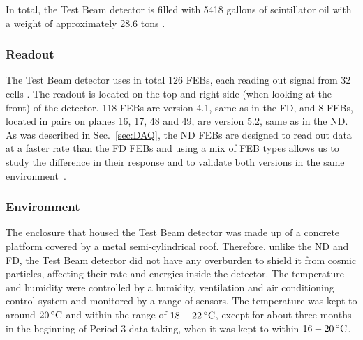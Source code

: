 
In total, the Test Beam detector is filled with 5418 gallons of scintillator oil with a weight of approximately 28.6 tons \cite{NOvA-doc-29543}.

\subsubsection*{Readout}
The Test Beam detector uses in total 126 \glspl{FEB}, each reading out signal from 32 cells \cite{NOvA-doc-29543}. The readout is located on the top and right side (when looking at the front) of the detector. 118 \glspl{FEB} are version 4.1, same as in the \gls{FD}, and 8 \glspl{FEB}, located in pairs on planes 16, 17, 48 and 49, are version 5.2, same as in the \gls{ND}. As was described in Sec.~\ref{sec:DAQ}, the \gls{ND} \glspl{FEB} are designed to read out data at a faster rate than the \gls{FD} \glspl{FEB} and using a mix of \gls{FEB} types allows us to study the difference in their response and to validate both versions in the same environment~\cite{LackeyThesisNOvATBProtons2022.pdf}.


\subsubsection*{Environment}
The enclosure that housed the Test Beam detector was made up of a concrete platform covered by a metal semi-cylindrical roof. Therefore, unlike the \gls{ND} and \gls{FD}, the Test Beam detector did not have any overburden to shield it from cosmic particles, affecting their rate and energies inside the detector. The temperature and humidity were controlled by a humidity, ventilation and air conditioning control system and monitored by a range of sensors. The temperature was kept to around $\unit[20]{^{\circ}C}$ and within the range of $\unit[18-22]{^{\circ}C}$, except for about three months in the beginning of Period 3 data taking, when it was kept to within $\unit[16-20]{^{\circ}C}$.


